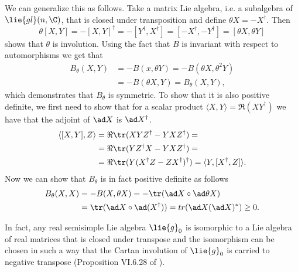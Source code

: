 We can generalize this as follows. Take a matrix Lie algebra, i.e. a subalgebra of $\lie{gl}(n,\C)$, that is closed under transposition and define $\theta X = -X^\dag$. Then
 \[
  \theta [X,Y] = -[X,Y]^\dag = - [Y^\dag,X^\dag] = [-X^\dag,-Y^\dag] = [\theta X, \theta Y]
 \]
 shows that $\theta$ is involution. Using the fact that $B$ is invariant with respect to automorphisms we get that
 \begin{align*}
  B_\theta(X,Y) &= -B(x,\theta Y) = - B(\theta X, \theta^2 Y) \\
                &= -B(\theta X, Y) = B_\theta(X,Y),
 \end{align*}
 which demonstrates that $B_\theta$ is symmetric. To show that it is also positive definite, we first need to show that for a scalar product $\langle X,Y \rangle = \Re (XY^\dag)$ we have that the adjoint of $\ad X$ is $\ad X^\dag$.
 \begin{align*}
  \langle [X,Y],Z \rangle &= \Re\tr (XYZ^\dag - YXZ^\dag) = \\
			  &= \Re\tr (YZ^\dag X - YXZ^\dag) =  \\%
                          &= \Re\tr( Y(X^\dag Z - ZX^\dag)^\dag) = \langle Y, [X^\dag,Z] \rangle.
 \end{align*}
 Now we can show that $B_\theta$ is in fact positive definite as follows
 \begin{align*}
  B_\theta(X,X) &= -B(X,\theta X) = -\tr (\ad X \circ \ad \theta X )\\
                &= \tr (\ad X \circ \ad (X^\dag))  = tr (\ad X (\ad X)^*) \geq 0.
 \end{align*}

In fact, any real semisimple Lie algebra $\lie{g}_0$ is isomorphic to a Lie algebra of real matrices that is closed under transpose and the isomorphism can be chosen in such a way that the Cartan involution of $\lie{g}_0$ is carried to negative transpose (Proposition VI.6.28 of \cite{knapp}).

